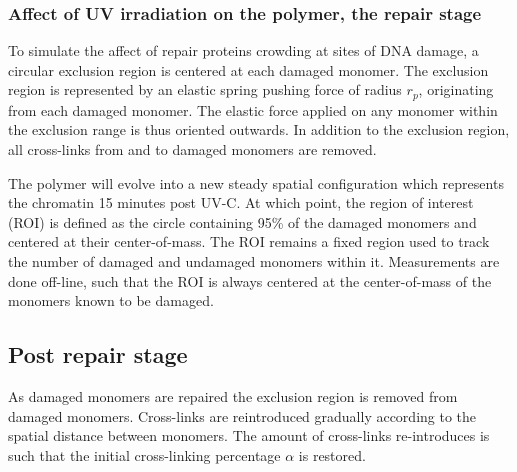 \documentclass[12pt]{report}
\begin{document}
	\subsubsection{Affect of UV irradiation on the polymer, the repair stage}	
	To simulate the affect of repair proteins crowding at sites of DNA damage, a circular exclusion region is centered at each damaged monomer. The exclusion region is represented by an elastic spring pushing force of radius $r_p$, originating from each damaged monomer. The elastic force applied on any monomer within the exclusion range is thus oriented outwards. In addition to the exclusion region, all cross-links from and to damaged monomers are removed.
	
	The polymer will evolve into a new steady spatial configuration which represents the chromatin 15 minutes post UV-C. At which point, the region of interest (ROI) is defined as the circle containing 95\% of the damaged monomers and centered at their center-of-mass. The ROI remains a fixed region used to track the number of damaged and undamaged monomers within it. Measurements are done off-line, such that the ROI is always centered at the center-of-mass of the monomers known to be damaged.
	
	\subsection{Post repair stage}
	As damaged monomers are repaired the exclusion region is removed from damaged monomers. Cross-links are reintroduced gradually according to the spatial distance between monomers. The amount of cross-links re-introduces is such that the initial cross-linking percentage $\alpha$ is restored.
	
	
\end{document}
